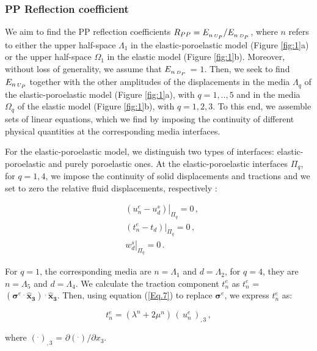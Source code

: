 \documentclass[draft]{agujournal2019}
\begin{document}
\subsubsection{PP Reflection coefficient}
We aim to find the PP reflection coefficients $R_{PP} = \tensor*[]{E}{_n_{\, \text{\tiny $U_P$}}}/ \tensor[]{E}{_n_{\, \text{\tiny $D_P$}}}$, where  $n$ refers to either the upper half-space $ \Lambda_1$ in the elastic-poro\-elastic model (Figure \ref{fig:1}a) or the upper half-space $\Omega_1$ in the elastic model  (Figure \ref{fig:1}b).
Moreover, without loss of generality, we assume that $ \tensor[]{E}{_n_{\, \text{\tiny $D_P$}}}$ = $1$. Then, we seek to find ${E}_{n\, \text{\tiny $U_P$}}$ together with the other amplitudes of the displacements in the  media $\Lambda_q$ of the elastic-poroelastic model (Figure \ref{fig:1}a), with $q=1,..,5$ and  in the media $\Omega_q$ of the elastic model (Figure \ref{fig:1}b), with $q=1,2,3$. To this end,
we assemble sets of linear equations, which we find by imposing the continuity of different physical quantities at the corresponding media interfaces.

For the elastic-poroelastic model, we distinguish two types of interfaces: elastic-poroelastic and purely poroelastic ones. At the elastic-poroelastic interfaces $\Pi_q$, for  $q=1,4$,
we impose the continuity of solid displacements and tractions and we set to zero the relative fluid displacements, respectively \cite{Deresiewicz1963}: 
\begin{linenomath*}
\begin{equation}\label{Eq.13}
\begin{split}
&  \left. \left(  u_n^e -  u_d^s \right) \right \rvert_{\Pi_q} = 0 \,, \\
&  \left. \left(  t_n^e -  t_d \right) \right \rvert_{\Pi_q} = 0 \,,\\
& \left.  w_d^s \right \rvert_{\Pi_q} = 0 \,.
\end{split}
\end{equation}
\end{linenomath*}
For $q=1$, the corresponding media are $n=\Lambda_1$ and $d=\Lambda_2$, for $q=4$, they are $n=\Lambda_5$ and $d=\Lambda_4$.
We calculate the traction component $t_n^e$ as $t_n^e$ = $ ({\bm{\sigma}^e} \,^{\bm{.}} \,\bm{\hat x_3}) \, ^{\bm{.}} \, \bm{\hat x_3}$. Then, using equation (\ref{Eq.7}) to replace $\bm{\sigma}^e$, we express $t_n^e$ as:
\begin{linenomath*}
\begin{equation}\label{Eq.14}
t_n^e =(\lambda^n + 2 \mu^n)\,  \left( \, u_n^{e} \, \right)_{,3} \,,
\end{equation}
\end{linenomath*}
where  $(^.)_{,3}$ = $\partial (^.)/ \partial{x_3}$. 
\end{document}
